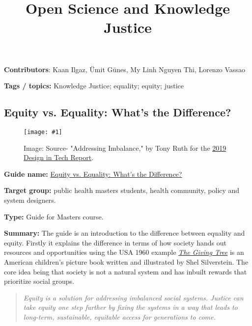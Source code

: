 \documentclass{article}
\newlength{\imgwidth}
\newcommand\scaledgraphics[2]{%
                
\settowidth{\imgwidth}{\texttt{[image: \#1]}}%
                
\setlength{\imgwidth}{\minof{\imgwidth}{#2\textwidth}}%
                
\texttt{[image: \#1]}%
                
}
\begin{document}
\title{Open Science and Knowledge Justice}

\maketitle


\textbf{Contributors}: Kaan Ilgaz, Ümit Günes, My Linh Nguyen Thi, Lorenzo Vassao


\textbf{Tags / topics:} Knowledge Justice; equality; equity; justice  


\subsection{Equity vs. Equality: What's the Difference?}\label{H7912011}



\begin{center}
\begin{figure}
\scaledgraphics{f0cce63a-bf54-49fe-bc74-0291d6668193.png}{0.75}
\caption*{Image: Source- "Addressing Imbalance," by Tony Ruth for the \href{https://designintech.report/2019/03/11/%F0%9F%93%B1design-in-tech-report-2019-section-6-addressing-imbalance/}{2019 Design in Tech Report}.                                                                                            }\label{F24704971}
\end{figure}


\end{center}


\textbf{Guide name: }\href{https://onlinepublichealth.gwu.edu/resources/equity-vs-equality/}{Equity vs. Equality: What's the Difference? }\autocite{mphgw_the_george_washington_university_equity_2020} 


\textbf{Target group:} public health masters students, health community, policy and system designers.


\textbf{Type:} Guide for Masters course.


\textbf{Summary:} The guide is an introduction to the difference between equality and equity. Firstly it explains the difference in terms of how society hands out resources and opportunities using the USA 1960 example \emph{\href{https://en.wikipedia.org/wiki/The_Giving_Tree}{The Giving Tree}} is an American children's picture book written and illustrated by Shel Silverstein. The core idea being that society is not a natural system and has inbuilt rewards that prioritize social groups.

\begin{quote}



\emph{Equity is a solution for addressing imbalanced social systems. Justice can take equity one step further by fixing the systems in a way that leads to long-term, sustainable, equitable access for generations to come.}


\end{quote}
\end{document}
